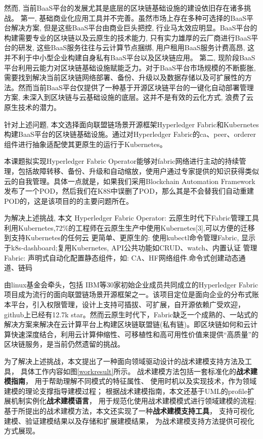 然而, 当前BaaS平台的发展尤其是底层的区块链基础设施的建设依旧存在诸多挑战。
第一, 基础商业化应用工具并不完善\footnotemark[1]。虽然市场上存在多种可选择的BaaS平台解决方案, 但是这些BaaS平台由商业巨头把控, 行业马太效应明显\cite{KuernetesbasedFabricChaincodeManagementAndHihgAvailabilityTechnology}。BaaS平台的构建需要专业的区块链以及云原生的技术能力, 只有实力雄厚的云厂商进行BaaS平台的研发, 这些BaaS服务往往与云计算节点捆绑, 用户租用BaaS服务计费高昂, 这并不利于中小型企业构建自身私有BaaS平台以及区块链应用。
第二, 现阶段BaaS平台利用云能力对区块链基础设施赋能乏力。对于BaaS平台市场规模的不断膨胀, 需要找到解决当前区块链网络部署、备份、升级以及数据存储以及可扩展性的方法。然而当前BaaS平台仅提供了一种基于开源区块链平台的一键化自动部署管理方案, 未深入到区块链与云基础设施的底层。这并不是有效的云化方式, 浪费了云原生技术的潜力。

针对上述问题, 本文选择面向联盟链场景开源框架Hyperledger Fabric和Kubernetes构建BaaS平台的区块链基础设施。通过对Hyperledger Fabric的ca、peer、orderer组件进行抽象适配使其更原生的运行于Kubernetes。

本课题拟实现Hyperledger Fabric Operator能够对fabric网络进行主动的持续管理，包括故障转移、备份、升级和自动缩放，使用户通过专家提供的知识获得类似云的自我管理。具体一点就是，如果我们采用Blockchain Automation Framework发布了一个POD，然后我们在K8S中误删了POD，那么其是不会替我们自动重建POD的，这是该项目的的主要问题所在。

为解决上述挑战, 本文
Hyperledger Fabric Operator: 云原生时代下Fabric管理工具
利用Kubernetes,72\%的工程师在云原生生产中使用Kubernetes[3],可以方便的迁移到支持Kubernetes的任何云 
更简单、更原生的: 使用kubectl命令管理Fabric, 显示于k8s-dashboard;复用Kubernetes, API公共功能如CRUD、watch、内置认证
管理Fabric: 声明式自动化配置静态组件，如: CA、HF网络组件.命令式创建动态通道、链码

由linux基金会牵头，包括 IBM等30家初始企业成员共同成立的Hyperledger Fabric项目成为流行的面向联盟链场景开源框架之一。该项目定位是面向企业的分布式账本平台，引入权限管理，设计上支持可插拔、可扩展，自开源依赖广受欢迎，github上已经有12.7k star。然而云原生时代下，Fabric缺乏一个成熟的、一站式的解决方案来解决在云计算平台上构建区块链联盟链(私有链)。即区块链如何和云计算快速深度结合，利用云计算伸缩性、可移植性和高可用性价值来提供“高质量”的区块链服务，是当前仍然遗留的挑战。


为了解决上述挑战，本文提出了一种面向领域驱动设计的战术建模支持方法及工具，
具体工作内容如图\ref{workresult}所示。
战术建模方法包括一套标准化的\textbf{战术建模指南}，
用于帮助理解不同模式的特征属性、
使用时机以及实现技术，作为领域建模的理论支撑指导建模过程；
根据战术建模指南，本文还基于UML的profile扩展机制实例化\textbf{战术建模语言}，
用于规范化使用战术建模模式进行领域建模的流程;
基于所提出的战术建模方法，本文还实现了一种\textbf{战术建模支持工具}，
支持可视化建模、验证建模结果以及存储和扩展建模结果，
为战术建模支持方法提供可视化方式展现。


